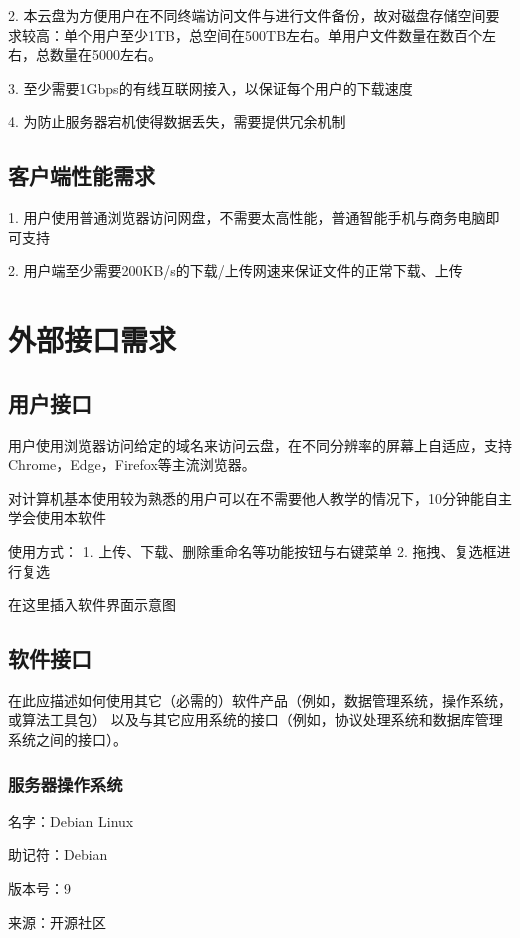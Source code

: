 2. 本云盘为方便用户在不同终端访问文件与进行文件备份，故对磁盘存储空间要求较高：单个用户至少1TB，总空间在500TB左右。单用户文件数量在数百个左右，总数量在5000左右。

3. 至少需要1Gbps的有线互联网接入，以保证每个用户的下载速度

4. 为防止服务器宕机使得数据丢失，需要提供冗余机制

\subsection{客户端性能需求}

1. 用户使用普通浏览器访问网盘，不需要太高性能，普通智能手机与商务电脑即可支持

2. 用户端至少需要200KB/s的下载/上传网速来保证文件的正常下载、上传

\section{外部接口需求}
\subsection{用户接口}

用户使用浏览器访问给定的域名来访问云盘，在不同分辨率的屏幕上自适应，支持Chrome，Edge，Firefox等主流浏览器。

对计算机基本使用较为熟悉的用户可以在不需要他人教学的情况下，10分钟能自主学会使用本软件

使用方式：
1. 上传、下载、删除重命名等功能按钮与右键菜单
2. 拖拽、复选框进行复选

在这里插入软件界面示意图

\subsection{软件接口}

在此应描述如何使用其它（必需的）软件产品（例如，数据管理系统，操作系统，或算法工具包）
以及与其它应用系统的接口（例如，协议处理系统和数据库管理系统之间的接口）。

\subsubsection{服务器操作系统}

名字：Debian Linux

助记符：Debian

版本号：9

来源：开源社区

